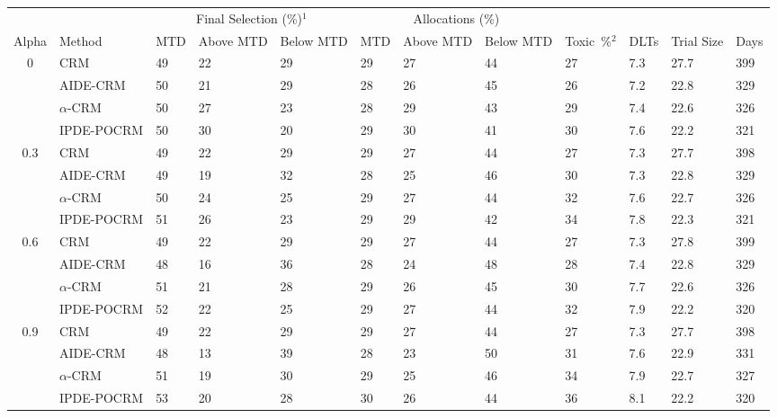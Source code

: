\begin{tabular*}{\textwidth}{@{\extracolsep\fill}clllllllllll@{\extracolsep\fill}}
\toprule
&  & \multicolumn{3}{c}{Final Selection (\%)$^1$} & \multicolumn{3}{c}{Allocations (\%)} & &  &  &  \\
\multirow{2}{2em}{Alpha} & \multirow{2}{2em}{Method} & \multirow{2}{2em}{MTD} & \multirow{2}{2em}{Above MTD} & \multirow{2}{2em}{Below MTD} & \multirow{2}{2em}{MTD} & \multirow{2}{2em}{Above MTD} & \multirow{2}{2em}{Below MTD} & \multirow{2}{2em}{Toxic~\%$^2$} & \multirow{2}{2em}{DLTs} & \multirow{2}{2em}{Trial Size} & \multirow{2}{2em}{Days}  \\ \\ 
\midrule
\multirow{4}{2em}{0} & CRM & 49 & 22 & 29 & 29 & 27 & 44 & 27 & 7.3 & 27.7 & 399\\
 & AIDE-CRM & 50 & 21 & 29 & 28 & 26 & 45 & 26 & 7.2 & 22.8 & 329\\
 & $\alpha$-CRM & 50 & 27 & 23 & 28 & 29 & 43 & 29 & 7.4 & 22.6 & 326\\
 & IPDE-POCRM & 50 & 30 & 20 & 29 & 30 & 41 & 30 & 7.6 & 22.2 & 321\\
\midrule
\multirow{4}{2em}{0.3} & CRM & 49 & 22 & 29 & 29 & 27 & 44 & 27 & 7.3 & 27.7 & 398\\
 & AIDE-CRM & 49 & 19 & 32 & 28 & 25 & 46 & 30 & 7.3 & 22.8 & 329\\
 & $\alpha$-CRM & 50 & 24 & 25 & 29 & 27 & 44 & 32 & 7.6 & 22.7 & 326\\
 & IPDE-POCRM & 51 & 26 & 23 & 29 & 29 & 42 & 34 & 7.8 & 22.3 & 321\\
\midrule
\multirow{4}{2em}{0.6} & CRM & 49 & 22 & 29 & 29 & 27 & 44 & 27 & 7.3 & 27.8 & 399\\
 & AIDE-CRM & 48 & 16 & 36 & 28 & 24 & 48 & 28 & 7.4 & 22.8 & 329\\
 & $\alpha$-CRM & 51 & 21 & 28 & 29 & 26 & 45 & 30 & 7.7 & 22.6 & 326\\
 & IPDE-POCRM & 52 & 22 & 25 & 29 & 27 & 44 & 32 & 7.9 & 22.2 & 320\\
\midrule
\multirow{4}{2em}{0.9} & CRM & 49 & 22 & 29 & 29 & 27 & 44 & 27 & 7.3 & 27.7 & 398\\
 & AIDE-CRM & 48 & 13 & 39 & 28 & 23 & 50 & 31 & 7.6 & 22.9 & 331\\
 & $\alpha$-CRM & 51 & 19 & 30 & 29 & 25 & 46 & 34 & 7.9 & 22.7 & 327\\
 & IPDE-POCRM & 53 & 20 & 28 & 30 & 26 & 44 & 36 & 8.1 & 22.2 & 320\\
\bottomrule
\end{tabular*}
